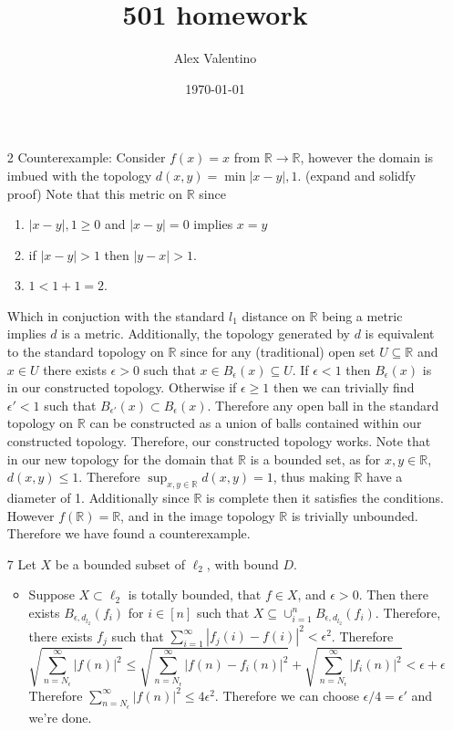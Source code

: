 \documentclass[12pt, letterpaper]{article}
\date{\today}
\author{Alex Valentino}
\title{501 homework}
\newcommand{\R}{\mathbb{R}}
\begin{document}
\begin{enumerate}
	\item[2] Counterexample: Consider $f(x) = x$ from $\R \to \R$, however the 
	domain is imbued with the topology $d(x,y) = \min{|x-y|, 1}$.  (expand and solidfy proof) Note that this metric
	on $\R$ since \begin{enumerate}
		\item $|x-y|,1\geq 0$ and $|x-y| = 0$ implies $x=y$
		\item if $|x-y| > 1$ then $|y-x| > 1$.  
		\item $1 < 1 + 1 = 2$.  
	\end{enumerate}
	Which in conjuction with the standard $l_1$ distance on $\R$ being a metric implies $d$ is a metric.  Additionally, the topology generated by $d$ is equivalent to the 
	standard topology on $\R$ since for any (traditional) open set $U \subseteq \R$
	and $x \in U$ there exists $\epsilon >0 $ such that $x \in B_\epsilon(x) \subseteq U$.  If $\epsilon < 1$ then $B_\epsilon(x)$ is in our constructed topology.  Otherwise
	if $\epsilon \geq 1$ then we can trivially find $\epsilon' < 1$ such that 
	$B_{\epsilon'}(x) \subset B_{\epsilon}(x)$.  Therefore any open ball in the standard 
	topology on $\R$ can be constructed as a union of balls contained within our constructed topology.  Therefore, our constructed topology works.  Note that in our
	new topology for the domain that $\R$ is a bounded set, as for $x,y \in \R$, 
	$d(x,y) \leq 1$.  Therefore $\sup_{x,y \in \R} d(x,y) = 1$, thus making $\R$ have a 
	diameter of 1.  Additionally since $\R$ is complete then it satisfies the conditions.  However $f(\R) = \R$, and in the image topology $\R$ is trivially unbounded.  Therefore we have found a counterexample.  
	\item[7] Let $X$ be a bounded subset of $\ell_2$, with bound $D$. 
	\begin{itemize}
		\item Suppose $X \subset \ell_2$ is totally bounded, that 
		$f \in X$, and $\epsilon > 0$.  Then there exists $B_{\epsilon,d_{l_2}}(f_i)$ for 
		$i \in [n]$ such that $X \subseteq \cup_{i=1}^nB_{\epsilon,d_{l_2}}(f_i) $.
		Therefore, there exists $f_j$ such that $\sum_{i=1}^\infty | f_j(i) - f(i)|^2 < \epsilon^2$.  Therefore 
		$$
		\sqrt{\sum_{n = N_\epsilon}^\infty |f(n)|^2} \leq \sqrt{\sum_{n=N_\epsilon}^\infty |f(n) - f_i(n)|^2} + \sqrt{\sum_{n = N_\epsilon}^\infty |f_i(n)|^2} < \epsilon + \epsilon
		$$
		Therefore $\sum_{n = N_\epsilon}^\infty |f(n)|^2 \leq 4 \epsilon^2$.  
		Therefore we can choose $\epsilon/4 = \epsilon'$ and we're done.

\end{itemize}
\end{enumerate}
\end{document}
